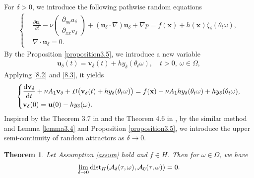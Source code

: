 \documentclass{elsarticle}
\newtheorem{theorem}{Theorem}[section]
\theoremstyle{definition}
\numberwithin{equation}{section}
\newcommand{\dist}{{\rm dist}}
\newcommand{\A}{\mathcal{A}}
\renewcommand{\d}{{\rm{d}}}
\begin{document}
For $\delta>0$, we introduce the following pathwise random equations
 \begin{align} \label{8.2}
 \left \{
  \begin{aligned}
 &  \frac{\partial \textbf{u}_{\delta}}{\partial t}-  \nu \left(
\begin{array}{ccc}
\partial_{yy}u_{\delta}\\ \partial_{xx}v_{\delta}
\end{array}\right)+(\textbf{u}_{\delta}\cdot\nabla)\textbf{u}_{\delta}+\nabla p=  f(\textbf{x}) +h(\textbf{x})\zeta_{\delta}(\theta_t\omega),\\
  & \nabla\cdot \textbf{u}_{\delta}=0.
  \end{aligned} \right.
\end{align}
By the Proposition \ref{proposition3.5}, we introduce a new variable
 \begin{align}\label{8.3}
\textbf{u}_\delta(t)=\textbf{v}_\delta(t)+hy_\delta(\theta_t\omega),\quad t>0,\ \omega\in \Omega,
\end{align}
Applying \eqref{8.2} and \eqref{8.3}, it yields
\begin{align}\label{8.4}
\left\{
\begin{aligned}
&
\frac{\d \textbf{v}_\delta}{\d t}+ \nu A_1\textbf{v}_\delta+B\big( \textbf{v}_\delta(t)+hy_\delta(\theta_t\omega)\big)=f(\textbf{x})-  \nu A_1hy_\delta(\theta_t\omega)+hy_\delta (\theta_t\omega), \\
& \textbf{v}_\delta(0)=\textbf{u}(0)-hy_\delta (\omega).
\end{aligned}
\right.
\end{align}
Inspired by the Theorem 3.7 in \cite{gu2020} and the Theorem 4.6 in \cite{gu2019}, by the similar method and Lemma \ref{lemma3.4} and Proposition \ref{proposition3.5}, we introduce the upper semi-continuity of random attractors as $\delta\rightarrow0$.
\begin{theorem}
 Let Assumption \ref{assum} hold and $f\in H$. Then for $\omega\in\Omega$, we have
 \begin{align*}
 \lim\limits_{\delta\rightarrow 0} \dist_{H}(\A_{\delta}(\tau,\omega),\A_0(\tau,\omega))=0.
 \end{align*}
\end{theorem}
\end{document}
